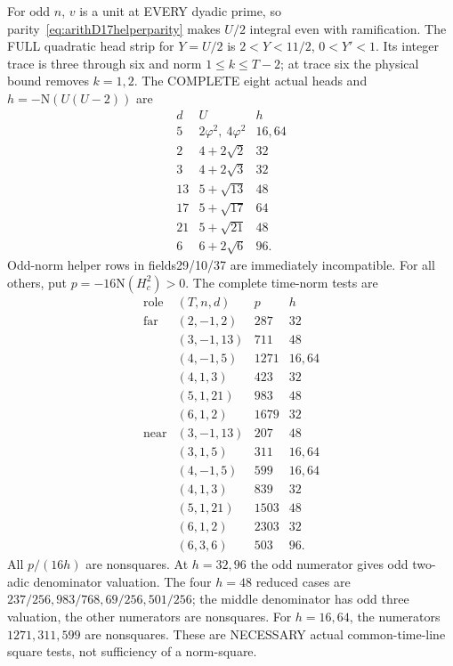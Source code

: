 For odd \(n\), \(v\) is a unit at EVERY dyadic
prime, so parity~\eqref{eq:arithD17helperparity}
makes \(U/2\) integral even with ramification.
The FULL quadratic head strip for \(Y=U/2\)
is \(2<Y<11/2\), \(0<Y'<1\).
Its integer trace is three through six and
norm \(1\le k\le T-2\); at trace six the
physical bound removes \(k=1,2\).
The COMPLETE eight actual heads and
\(h=-\mathrm N(U(U-2))\) are
\[
\begin{array}{c|c|c}
 d&U&h\\ \hline
5&2\varphi^2,\ 4\varphi^2&16,64\\
2&4+2\sqrt2&32\\
3&4+2\sqrt3&32\\
13&5+\sqrt{13}&48\\
17&5+\sqrt{17}&64\\
21&5+\sqrt{21}&48\\
6&6+2\sqrt6&96 .
\end{array}
\]
Odd-norm helper rows in fields29/10/37 are
immediately incompatible.
For all others, put
\(p=-16\mathrm N(H_c^2)>0\).
The complete time-norm tests are
\[
\begin{array}{c|c|r|l}
 \text{role}&(T,n,d)&p&h\\ \hline
 \text{far}&(2,-1,2)&287&32\\
 &(3,-1,13)&711&48\\
 &(4,-1,5)&1271&16,64\\
 &(4,1,3)&423&32\\
 &(5,1,21)&983&48\\
 &(6,1,2)&1679&32\\
 \text{near}&(3,-1,13)&207&48\\
 &(3,1,5)&311&16,64\\
 &(4,-1,5)&599&16,64\\
 &(4,1,3)&839&32\\
 &(5,1,21)&1503&48\\
 &(6,1,2)&2303&32\\
 &(6,3,6)&503&96 .
\end{array}
\]
All \(p/(16h)\) are nonsquares.
At \(h=32,96\) the odd numerator gives odd
two-adic denominator valuation.
The four \(h=48\) reduced cases are
\(237/256,983/768,69/256,501/256\);
the middle denominator has odd three valuation,
the other numerators are nonsquares.
For \(h=16,64\), the numerators
\(1271,311,599\) are nonsquares.
These are NECESSARY actual common-time-line
square tests, not sufficiency of a norm-square.

